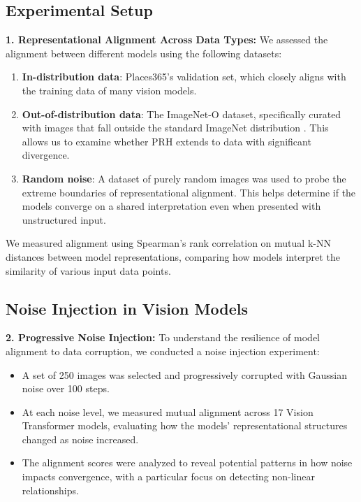 \documentclass[10pt,a4paper]{article}
\begin{document}
\subsection{Experimental Setup}
\textbf{1. Representational Alignment Across Data Types:} We assessed the alignment between different models using the following datasets:
\begin{enumerate}
    \item \textbf{In-distribution data}: Places365’s validation set, which closely aligns with the training data of many vision models.
    \item \textbf{Out-of-distribution data}: The ImageNet-O dataset, specifically curated with images that fall outside the standard ImageNet distribution \cite{hendrycks2021nae}. This allows us to examine whether PRH extends to data with significant divergence.
    \item \textbf{Random noise}: A dataset of purely random images was used to probe the extreme boundaries of representational alignment. This helps determine if the models converge on a shared interpretation even when presented with unstructured input.
\end{enumerate}

We measured alignment using Spearman's rank correlation on mutual k-NN distances between model representations, comparing how models interpret the similarity of various input data points.



\subsection{Noise Injection in Vision Models}
\textbf{2. Progressive Noise Injection:} To understand the resilience of model alignment to data corruption, we conducted a noise injection experiment:
\begin{itemize}
    \item A set of 250 images was selected and progressively corrupted with Gaussian noise over 100 steps.
    \item At each noise level, we measured mutual alignment across 17 Vision Transformer models, evaluating how the models' representational structures changed as noise increased.
    \item The alignment scores were analyzed to reveal potential patterns in how noise impacts convergence, with a particular focus on detecting non-linear relationships.
\end{itemize}
\end{document}
